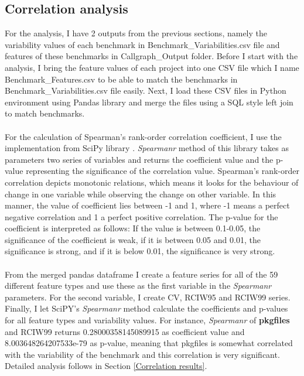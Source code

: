 \documentclass{seal_thesis}
\begin{document}
\subsection{Correlation analysis}
\label{Correlation analysis}
For the analysis, I have 2 outputs from the previous sections, namely the variability values of each benchmark in Benchmark\_Variabilities.csv file and features of these benchmarks in Callgraph\_Output folder. Before I start with the analysis, I bring the feature values of each project into one CSV file which I name Benchmark\_Features.csv to be able to match the benchmarks in Benchmark\_Variabilities.csv file easily. Next, I load these CSV files in Python environment using Pandas library \cite{Pandas} and merge the files using a SQL style left join to match benchmarks.\\
\\
For the calculation of Spearman's rank-order correlation coefficient, I use the implementation from SciPy library \cite{ScipySpearmanr}. \textit{Spearmanr} method of this library takes as parameters two series of variables and returns the coefficient value and the p-value representing the significance of the correlation value. Spearman's rank-order correlation depicts monotonic relations, which means it looks for the behaviour of change in one variable while observing the change on other variable. In this manner, the value of coefficient lies between -1 and 1, where -1 means a perfect negative correlation and 1 a perfect positive correlation. The p-value for the coefficient is interpreted as follows: If the value is between 0.1-0.05, the significance of the coefficient is weak, if it is between 0.05 and 0.01, the significance is strong, and if it is below 0.01, the significance is very strong. \\
\\
From the merged pandas dataframe I create a feature series for all of the 59 different feature types and use these as the first variable in the \textit{Spearmanr} parameters. For the second variable, I create CV, RCIW95 and RCIW99 series. Finally, I let SciPY's \textit{Spearmanr} method calculate the coefficients and p-values for all feature types and variability values. For instance, \textit{Spearmanr} of \textbf{pkgfiles} and RCIW99 returns 0.28000358145089915 as coefficient value and 8.003648264207533e-79 as p-value, meaning that pkgfiles is somewhat correlated with the variability of the benchmark and this correlation is very significant. Detailed analysis follows in Section \ref{Correlation results}.
\end{document}

